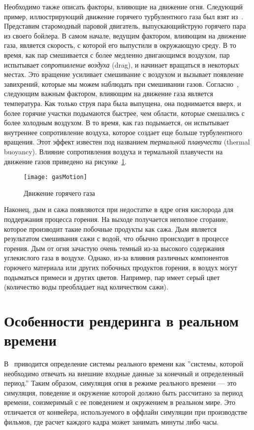 Необходимо также описать факторы, влияющие на движение огня. Следующий пример,
иллюстрирующий движение горячего турбулентного газа был взят
из~\cite{Foster1997ModelingTM}. Представим старомодный паровой двигатель,
выпускающий\break{}струю горячего пара из своего бойлера. В самом начале,
ведущим фактором, влияющим на движение газа, является скорость, с которой его
выпустили в окружающую среду. В то время, как пар смешивается с более медленно
двигающимся воздухом, пар испытывает \emph{сопротивление воздуха} (drag), и
начинает вращаться в некоторых местах. Это вращение усиливает смешивание с
воздухом и вызывает появление завихрений, которые мы можем наблюдать при
смешивании газов. Согласно~\cite{Foster1997ModelingTM}, следующим важным
фактором, влияющим на движение газа является температура. Как только струя пара
была выпущена, она поднимается вверх, и более горячие участки подымаются
быстрее, чем области, которые смешались с более холодным воздухом. В то время,
как газ подымается, он испытывает внутреннее сопротивление воздуха, которое
создает еще больше турбулентного вращения. Этот эффект известен под названием
\emph{термальной плавучести} (thermal buoyancy). Влияние сопротивления воздуха и
термальной плавучести на движение газов приведено на
рисунке~\ref{fig:gasMotion}.
\begin{figure}[htb]
	\centering
    \texttt{[image: gasMotion]}
	\caption{Движение горячего газа}%
    \label{fig:gasMotion}
\end{figure}

Наконец, дым и сажа появляются при недостатке в ядре огня кислорода для
поддержания процесса горения. На выходе получается неполное сгорание, которое
производит такие побочные продукты как сажа. Дым является результатом смешивания
сажи с водой, что обычно происходит в процессе горения. Дым от огня зачастую
очень темный из-за высокого содержания углекислого газа в воздухе. Однако, из-за
влияния различных компонентов горючего материала или других побочных продуктов
горения, в воздух могут подыматься примеси и других цветов. Например, пар имеет
серый цвет (количество воды преобладает над количеством сажи).

\section{Особенности рендеринга в реальном времени}

В~\cite{Young1982RealTL} приводится определение системы реального времени как
''системы, которой необходимо отвечать на внешние входные данные за конечный и
определенный период.'' Таким образом, симуляция огня в режиме реального времени
--- это симуляция, поведение и окружение которой должно быть рассчитано за
период времени, соизмеримый с ее поведением и окружением в реальном мире. Это
отличается от конвейера, используемого в оффлайн симуляции при производстве
фильмов, где расчет каждого кадра может занимать минуты либо часы.

